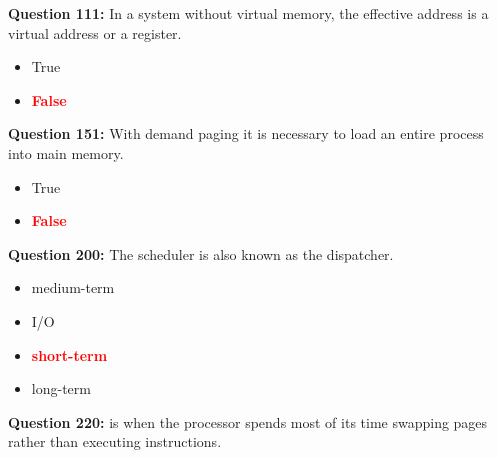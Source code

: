 \documentclass[12pt,a4paper]{article}
\begin{document}
\vspace{0.5cm}

\vspace{0.5cm}

\vspace{0.5cm}

\textbf{Question 111:} In a system without virtual memory, the effective address is a virtual address or a register.

\begin{itemize}
    \item[\textbf{A.}] True
    \item[\textbf{B.}] \textcolor{red}{\textbf{False}}
\end{itemize}

\vspace{0.5cm}

\vspace{0.5cm}

\textbf{Question 151:} With demand paging it is necessary to load an entire process into main memory.

\begin{itemize}
    \item[\textbf{A.}] True
    \item[\textbf{B.}] \textcolor{red}{\textbf{False}}
\end{itemize}

\vspace{0.5cm}

\vspace{0.5cm}

\textbf{Question 200:} The \underline{\hspace{1.5cm}} scheduler is also known as the dispatcher.

\begin{itemize}
    \item[\textbf{A.}] medium-term
    \item[\textbf{B.}] I/O
    \item[\textbf{C.}] \textcolor{red}{\textbf{short-term}}
    \item[\textbf{D.}] long-term
\end{itemize}

\vspace{0.5cm}

\vspace{0.5cm}

\textbf{Question 220:} \underline{\hspace{1.5cm}} is when the processor spends most of its time swapping pages rather than executing instructions.
\end{document}
